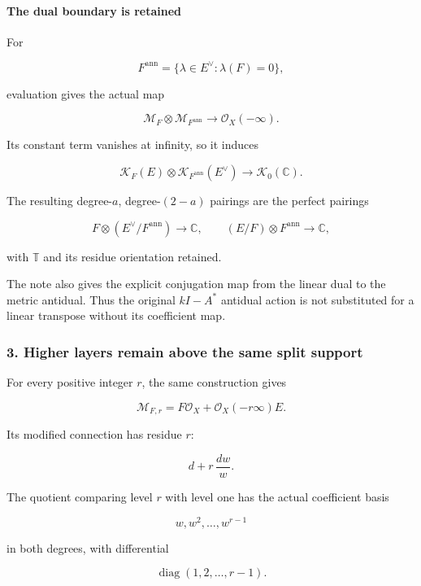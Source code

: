 \paragraph{The dual boundary is retained}\label{endpoint-exponential_constituent_original--the-dual-boundary-is-retained}

For

\[
F^{\mathrm{ann}}=\{\lambda\in E^\vee:\lambda(F)=0\},
\]

evaluation gives the actual map

\[
\mathcal M_F\otimes\mathcal M_{F^{\mathrm{ann}}}
\longrightarrow\mathcal O_X(-\infty).
\]

Its constant term vanishes at infinity, so it induces

\[
\boxed{
\mathcal K_F(E)\otimes
\mathcal K_{F^{\mathrm{ann}}}(E^\vee)
\longrightarrow
\mathcal K_0(\mathbb C).
}
\]

The resulting degree-\(a\), degree-\((2-a)\) pairings are the perfect pairings

\[
F\otimes(E^\vee/F^{\mathrm{ann}})\to\mathbb C,
\qquad
(E/F)\otimes F^{\mathrm{ann}}\to\mathbb C,
\]

with \(\mathbb T\) and its residue orientation retained.

The note also gives the explicit conjugation map from the linear dual to the metric antidual. Thus the original \(kI-A^*\) antidual action is not substituted for a linear transpose without its coefficient map.

\subsubsection{3. Higher layers remain above the same split support}\label{endpoint-exponential_constituent_original--higher-layers-remain-above-the-same-split-support}

For every positive integer \(r\), the same construction gives

\[
\mathcal M_{F,r}
=
F\mathcal O_X+\mathcal O_X(-r\infty)E.
\]

Its modified connection has residue \(r\):

\[
d+r\,\frac{dw}{w}.
\]

The quotient comparing level \(r\) with level one has the actual coefficient basis

\[
w,w^2,\ldots,w^{r-1}
\]

in both degrees, with differential

\[
\boxed{\operatorname{diag}(1,2,\ldots,r-1).}
\]

